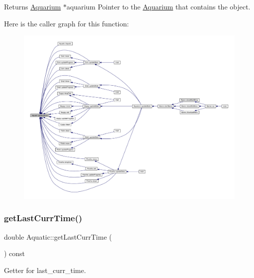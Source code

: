 \begin{DoxyReturn}{Returns}
\mbox{\hyperlink{class_aquarium}{Aquarium}} $\ast$aquarium Pointer to the \mbox{\hyperlink{class_aquarium}{Aquarium}} that contains the object. 
\end{DoxyReturn}
Here is the caller graph for this function\+:
\nopagebreak
\begin{figure}[H]
\begin{center}
\leavevmode
\includegraphics[width=350pt]{class_aquatic_aa84812ff8347a11345b9c8231c1375cc_icgraph}
\end{center}
\end{figure}
\mbox{\label{class_aquatic_aba770b1c9ca9481712a6963e7e8e2919}} 
\subsubsection{\texorpdfstring{get\+Last\+Curr\+Time()}{getLastCurrTime()}}
{\footnotesize\ttfamily double Aquatic\+::get\+Last\+Curr\+Time (\begin{DoxyParamCaption}{ }\end{DoxyParamCaption}) const}



Getter for last\+\_\+curr\+\_\+time. 

